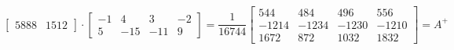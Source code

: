 \documentclass[12pt]{report}
\begin{document}
\begin{solution}
\[\begin{bmatrix}
         5888 & 1512
      \end{bmatrix} \cdot \begin{bmatrix}
         -1 & 4 & 3 & -2\\
         5 & -15 & -11 & 9
      \end{bmatrix} = \dfrac{1}{16744} \begin{bmatrix}
         544 & 484 & 496 & 556 \\
         -1214 & -1234 & -1230 & -1210 \\
         1672 & 872 & 1032 & 1832
      \end{bmatrix} = A^+
   \]
\end{solution}
\end{document}
